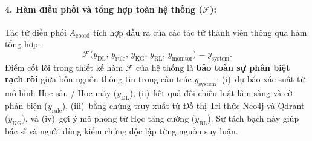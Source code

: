 \paragraph{4. Hàm điều phối và tổng hợp toàn hệ thống ($\mathcal{F}$):}
Tác tử điều phối $A_{\text{coord}}$ tích hợp đầu ra của các tác tử thành viên thông qua hàm tổng hợp:
\begin{equation}
  \mathcal{F}\big(y_{\text{DL}},\, y_{\text{rule}},\, y_{\text{KG}},\, y_{\text{RL}},\, y_{\text{monitor}}\big) = y_{\text{system}}.
  \label{eq:aggregation-func}
\end{equation}
Điểm cốt lõi trong thiết kế hàm $\mathcal{F}$ của hệ thống là \textbf{bảo toàn sự phân biệt rạch ròi} giữa bốn nguồn thông tin trong cấu trúc $y_{\text{system}}$: (i)~dự báo xác suất từ mô hình Học sâu / Học máy ($y_{\text{DL}}$), (ii)~kết quả đối chiếu luật lâm sàng và cờ phản biện ($y_{\text{rule}}$), (iii)~bằng chứng truy xuất từ Đồ thị Tri thức Neo4j và Qdrant ($y_{\text{KG}}$), và (iv)~gợi ý mô phỏng từ Học tăng cường ($y_{\text{RL}}$). Sự tách bạch này giúp bác sĩ và người dùng kiểm chứng độc lập từng nguồn suy luận.
